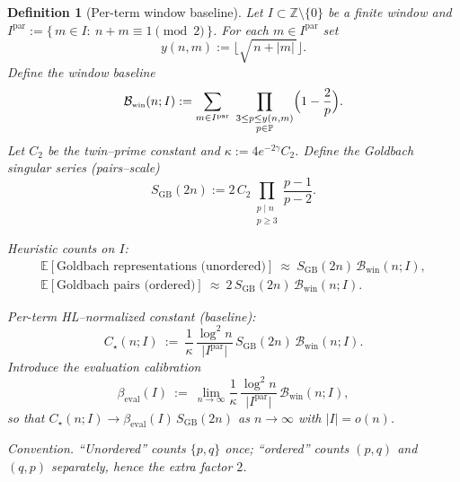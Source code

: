 \documentclass[11pt]{article}
\theoremstyle{inline}
\theoremstyle{break}
\theoremstyle{break}
\theoremstyle{break}
\theoremstyle{break}
\theoremstyle{break}
\theoremstyle{break}
\theoremstyle{break}
\newtheorem{definition}{Definition}
\theoremstyle{inline}
\newcommand{\twin}{{\scriptscriptstyle\mathrm{win}}}
\newcommand{\Bwin}{\mathcal{B}_\twin}
\newcommand{\betacal}{\beta_{\mathrm{eval}}}
\begin{document}
\begin{definition}[Per-term window baseline]\label{def:window-baseline}
Let \(I\subset\mathbb Z\setminus\{0\}\) be a finite window and
\(I^{\mathrm{par}}:=\{\,m\in I:\ n+m\equiv 1 \pmod 2\,\}\).
For each \(m\in I^{\mathrm{par}}\) set
\begin{equation}
y(n,m):=\bigl\lfloor\sqrt{\,n+|m|\,}\bigr\rfloor.
\end{equation}
Define the \emph{window baseline}
\begin{equation}
\Bwin(n;I):=\sum_{m\in I^{\mathrm{par}}}\ \prod_{\substack{3\le p\le y(n,m)\\ p\in\mathbb P}}
\Bigl(1-\frac{2}{p}\Bigr).
\end{equation}
Let \(C_2\) be the twin–prime constant and \(\kappa:=4e^{-2\gamma}C_2\).\cite{HardyLittlewood1923, MontgomeryVaughan2007}
Define the Goldbach singular series (pairs–scale)
\begin{equation}
S_{\mathrm{GB}}(2n):=2\,C_2\!\!\prod_{\substack{p\mid n\\ p\ge 3}}\frac{p-1}{p-2}.
\end{equation}

\emph{Heuristic counts on \(I\):}
\begin{equation}
\begin{aligned}
\mathbb{E}[\text{Goldbach representations (unordered)}]\ \approx\ S_{\mathrm{GB}}(2n)\,\Bwin(n;I), \\
\mathbb{E}[\text{Goldbach pairs (ordered)}]\ \approx\ 2\,S_{\mathrm{GB}}(2n)\,\Bwin(n;I).
\end{aligned}
\end{equation}

\emph{Per-term HL–normalized constant (baseline):}
\begin{equation}
C_\star(n;I)
\ :=\
\frac{1}{\kappa}\,\frac{\log^2 n}{\lvert I^{\mathrm{par}}\rvert}\,
S_{\mathrm{GB}}(2n)\,\Bwin(n;I).
\end{equation}
Introduce the evaluation calibration
\begin{equation}
\betacal(I)\ :=\ \lim_{n\to\infty}\frac{1}{\kappa}\,\frac{\log^2 n}{\lvert I^{\mathrm{par}}\rvert}\,\Bwin(n;I),
\end{equation}
so that \(C_\star(n;I)\to \betacal(I)\,S_{\mathrm{GB}}(2n)\) as \(n\to\infty\) with \(\lvert I\rvert=o(n)\).

\noindent\emph{Convention.} “Unordered” counts \(\{p,q\}\) once; “ordered” counts \((p,q)\) and \((q,p)\) separately, hence the extra factor \(2\).
\end{definition}
\end{document}
